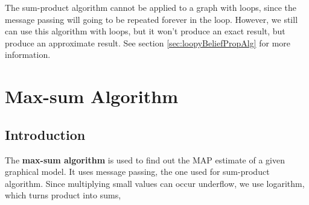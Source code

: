 \documentclass{article}
\begin{document}
        The sum-product algorithm cannot be applied to a graph with loops, since the message passing will
        going to be repeated forever in the loop. However, we still can use this algorithm with loops, but it won't
        produce an exact result, but produce an approximate result.
        See section \ref{sec:loopyBeliefPropAlg} for more information.

\newpage

\section{Max-sum Algorithm}
    \subsection{Introduction}
        The \textbf{max-sum algorithm} is used to find out the MAP estimate of a given
        graphical model. It uses message passing, the one used for sum-product algorithm.
        Since multiplying small values can occur underflow, we use logarithm, which turns product into sums,
\end{document}
